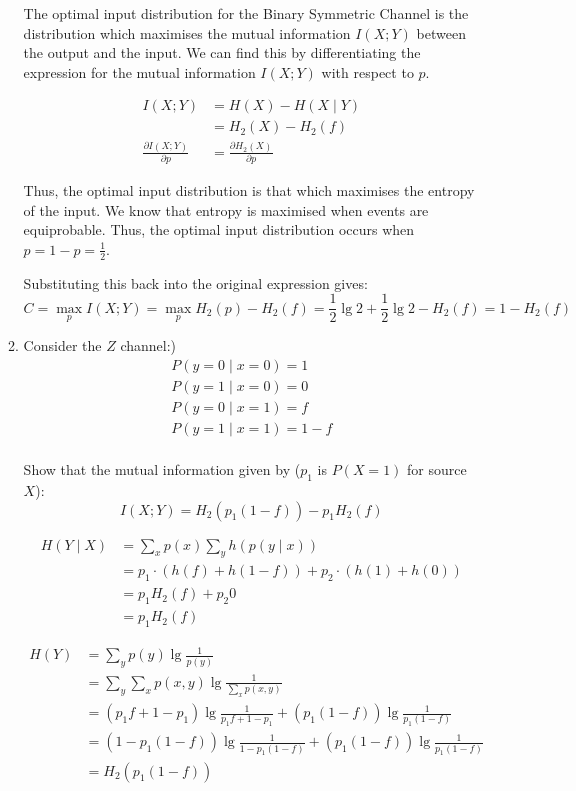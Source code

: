 \documentclass[10pt,\jkfside,a4paper]{article}
\begin{document}
\begin{enumerate}
\begin{enumerate}
        The optimal input distribution for the Binary Symmetric Channel is the distribution which maximises the mutual information $I(X; Y)$ between the output and the input. We can find this by differentiating the expression for the mutual information $I(X; Y)$ with respect to $p$.

        \begin{align*}
            I(X; Y)
            &= H(X) - H(X \mid Y) \\
            &= H_2(X) - H_2(f) \\
            \frac{\partial I(X; Y)}{\partial p}
            &= \frac{\partial H_2(X)}{\partial p}
        \end{align*}

        Thus, the optimal input distribution is that which maximises the entropy of the input. We know that entropy is maximised when events are equiprobable. Thus, the optimal input distribution occurs when $p = 1 - p = \frac12$.

        Substituting this back into the original expression gives:
        \[
            C = \max_p I(X; Y) = \max_p H_2(p) - H_2(f) = \frac12 \lg 2 + \frac12 \lg 2 - H_2(f) = 1 - H_2(f)
        \]

        \item Consider the $Z$ channel:)
        \begin{align*}
            P(y = 0 \mid x = 0) = 1 \\
            P(y = 1 \mid x = 0) = 0 \\
            P(y = 0 \mid x = 1) = f \\
            P(y = 1 \mid x = 1) = 1 - f \\
        \end{align*}

        Show that the mutual information given by ($p_1$ is $P(X = 1)$ for source $X$):
        \[
            I(X; Y) = H_2(p_1 (1 - f)) - p_1 H_2(f)
        \]

        \begin{align*}
            H(Y \mid X)
            &= \sum_x p(x) \sum_y h(p(y \mid x)) \\
            &= p_1 \cdot (h(f) + h(1 - f)) + p_2 \cdot (h(1) + h(0)) \\
            &= p_1 H_2(f) + p_2 0 \\
            &= p_1 H_2(f)
        \end{align*}

        \begin{align*}
            H(Y)
            &= \sum_y p(y) \lg \frac{1}{p(y)} \\
            &= \sum_y \sum_x p(x, y) \lg \frac{1}{\sum_x p(x, y)} \\
            &= (p_1 f + 1 - p_1) \lg \frac{1}{p_1 f + 1 - p_1} + (p_1(1 - f))\lg \frac{1}{p_1(1 - f)} \\
            &= (1 - p_1(1 - f)) \lg \frac{1}{1 - p_1(1 - f)} + (p_1(1 - f))\lg \frac{1}{p_1(1 - f)} \\
            &= H_2(p_1(1 - f))
        \end{align*}


\end{enumerate}
\end{enumerate}
\end{document}
